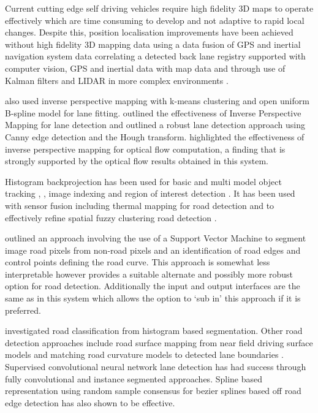 \documentclass[]{aiaa-tc}%
\begin{document}
Current cutting edge self driving vehicles require high fidelity 3D maps to operate effectively which are time consuming to develop and not adaptive to rapid local changes. Despite this, position localisation improvements have been achieved without high fidelity 3D mapping data using a data fusion of GPS and inertial navigation system data \citep{gpsInsFusion} correlating a detected back lane registry supported with computer vision, GPS and inertial data with map data \citep{lowCostSensorNav} and through use of Kalman filters and LIDAR in more complex environments \citep{robotLIDARSLAM}.


\citet{ipmBasedLaneDetectionApproach} also used inverse perspective mapping with k-means clustering and open uniform B-spline model for lane fitting. \citet{ipmForLaneTracking} outlined the effectiveness of Inverse Perspective Mapping for lane detection and \citet{canneyAndHoughLanes} outlined a robust lane detection approach using Canny edge detection and the Hough transform. \citet{ipmOpticalFlow} highlighted the effectiveness of inverse perspective mapping for optical flow computation, a finding that is strongly supported by the optical flow results obtained in this system.


Histogram backprojection has been used for basic \citep{histBackObjectTracking} and multi model object tracking \citep{histBackMultiObjectTrack}, \citep{histBackObjectMultiLighting}, image indexing \citep{histBackImageIndexing} and region of interest detection \citep{histBackObjectOfInterestDetection}. It has been used with sensor fusion including thermal mapping for road detection \citep{histBackThermal} and to effectively refine spatial fuzzy clustering road detection \citep{histBackRefineShadows}.

\citet{moncularLaneDetectAndTrack} outlined an approach involving the use of a Support Vector Machine to segment image road pixels from non-road pixels and an identification of road edges and control points defining the road curve. This approach is somewhat less interpretable however provides a suitable alternate and possibly more robust option for road detection. Additionally the input and output interfaces are the same as in this system which allows the option to `sub in' this approach if it is preferred. 

\citet{histogramSegmentationRoadClassification} investigated road classification from histogram based segmentation. Other road detection approaches include road surface mapping from near field driving surface models \citep{darpaChallengeRoadDetection} and matching road curvature models to detected lane boundaries \citep{intersectionDetectionSingleCamera}. Supervised convolutional neural network lane detection has had success through fully convolutional \citep{cnnLanes1} and instance segmented \citep{cnnLanes2} approaches. Spline based representation using random sample consensus for bezier splines based off road edge detection \citep{ransicBezierFit} has also shown to be effective.
\end{document}
